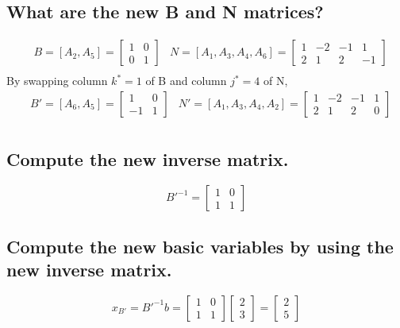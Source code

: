 \documentclass[11pt]{article}
\begin{document}
\subsection{What are the new B and N matrices?}
\begin{align*}
    & B = [A_2, A_5] = \begin{bmatrix} 1 & 0 \\ 0 & 1\end{bmatrix} & N = [A_1, A_3, A_4, A_6] = \begin{bmatrix} 1 & -2 & -1 & 1 \\ 2 & 1 & 2 & -1\end{bmatrix} \\
\end{align*}
By swapping column $k^*=1$ of B and column $j^*=4$ of N,
\begin{align*}
    & B' = [A_6, A_5] = \begin{bmatrix} 1 & 0 \\ -1 & 1\end{bmatrix} & N' = [A_1, A_3, A_4, A_2] = \begin{bmatrix} 1 & -2 & -1 & 1 \\ 2 & 1 & 2 & 0\end{bmatrix} \\
\end{align*}

\subsection{Compute the new inverse matrix.}
$$B'^{-1} = \begin{bmatrix} 1 & 0 \\ 1 & 1\end{bmatrix}$$

\subsection{Compute the new basic variables by using the new inverse matrix.}
$$x_{B'} = B'^{-1} b = \begin{bmatrix} 1 & 0 \\ 1 & 1\end{bmatrix} \begin{bmatrix} 2 \\ 3\end{bmatrix} = \begin{bmatrix} 2 \\ 5\end{bmatrix}$$
\end{document}
